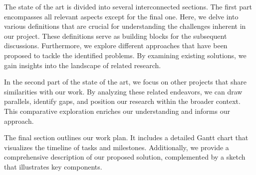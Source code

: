 The state of the art is divided into several interconnected sections. The first part encompasses all relevant aspects except for the final one. Here, we delve into various definitions that are crucial for understanding the challenges inherent in our project. These definitions serve as building blocks for the subsequent discussions. Furthermore, we explore different approaches that have been proposed to tackle the identified problems. By examining existing solutions, we gain insights into the landscape of related research.

In the second part of the state of the art, we focus on other projects that share similarities with our work. By analyzing these related endeavors, we can draw parallels, identify gaps, and position our research within the broader context. This comparative exploration enriches our understanding and informs our approach.

The final section outlines our work plan. It includes a detailed Gantt chart that visualizes the timeline of tasks and milestones. Additionally, we provide a comprehensive description of our proposed solution, complemented by a sketch that illustrates key components.
